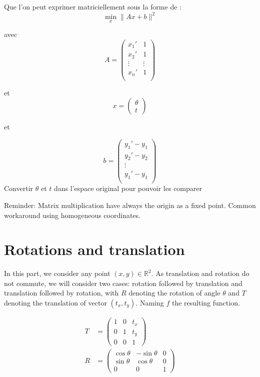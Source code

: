 \documentclass[paper=a4, fontsize=11pt, onecolumn, tikz, dvipsnames, svgnames, x11names]{article}
\begin{document}
Que l'on peut exprimer matriciellement sous la forme de :
$$
\min_x \lVert Ax + b \rVert^2
$$

avec
$$
A =
\begin{pmatrix}
x_1' & 1 \\
x_2' & 1 \\
\vdots & \vdots \\
x_n' & 1 \\
\end{pmatrix}
$$

et
$$
x =
\begin{pmatrix}
\theta \\
t
\end{pmatrix}
$$

et

$$
b =
\begin{pmatrix}
y_1' - y_1\\
y_2' - y_2\\
\vdots\\
y_1' - y_1\\
\end{pmatrix}
$$
Convertir $\theta$ et $t$ dans l'espace original pour pouvoir les comparer


\appendix

Reminder: Matrix multiplication have always the origin as a fixed point. Common workaround using homogeneous coordinates.

\section{Rotations and translation}

In this part, we consider any point \((x, y) \in \mathbb{R}^2\). As translation and rotation do not commute, we will consider two cases: rotation followed by translation and translation followed by rotation, with \(R\) denoting the rotation of angle \(\theta\) and \(T\) denoting the translation of vector \((t_x, t_y)\). Naming \(f\) the resulting function.

\begin{align*}
    T &=
    \begin{pmatrix}
    1 & 0 & t_x \\
    0 & 1 & t_y \\
    0 & 0 & 1
    \end{pmatrix}
    \\
    R &=
    \begin{pmatrix}
    \cos \theta & -\sin \theta & 0 \\
    \sin \theta & \cos \theta & 0 \\
    0 & 0 & 1
    \end{pmatrix}
\end{align*}
\end{document}
